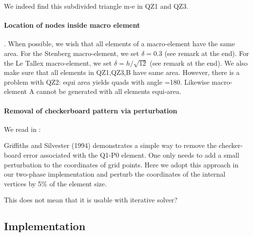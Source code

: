 We indeed find this subdivided triangle m-e in QZ1 and QZ3. 

\paragraph{Location of nodes inside macro element}.
When possible, we wish that all elements of a macro-element have the same area. 
For the Stenberg macro-element, we set $\delta =0.3$ (see remark at the end).
For the Le Tallex macro-element, we set $\delta=h/\sqrt{12}$ (see remark at the end).
We also make sure that all elements in QZ1,QZ3,B have same area.
However, there is a problem with QZ2: equi area yields quads with angle =180. 
Likewise macro-element  A cannot be generated with all elements equi-area.


\paragraph{Removal of checkerboard pattern via perturbation}

We read in \textcite{lumh24}:
\begin{displayquote}
{\color{MidnightBlue}
Griffiths and Silvester (1994) demonstrates a simple way to remove the checker-board 
error associated with the Q1-P0 element. One only needs to add a small perturbation 
to the coordinates of grid points. Here we adopt this approach in our two-phase 
implementation and perturb the coordinates of the internal vertices by 5\% of the
element size.
}
\end{displayquote}


This does not mean that it is usable with iterative solver?










\subsection*{Implementation}

